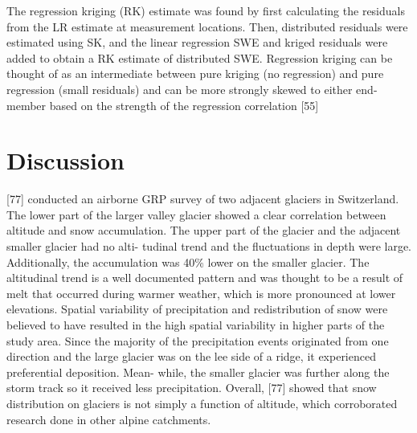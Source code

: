 \documentclass[twoside,twocolumn]{article}
\begin{document}
The regression kriging (RK) estimate was found by first calculating the residuals from the LR estimate at measurement locations. Then, distributed residuals were estimated using SK, and the linear regression SWE and kriged residuals were added to obtain a RK estimate of distributed SWE. Regression kriging can be thought of as an intermediate between pure kriging (no regression) and pure regression (small residuals) and can be more strongly skewed to either end-member based on the strength of the regression correlation [55]







\pagebreak
\pagebreak
\section{Discussion}
[77] conducted an airborne GRP survey of two adjacent glaciers in Switzerland. The
lower part of the larger valley glacier showed a clear correlation between altitude and snow
accumulation. The upper part of the glacier and the adjacent smaller glacier had no alti-
tudinal trend and the fluctuations in depth were large. Additionally, the accumulation was
40\% lower on the smaller glacier. The altitudinal trend is a well documented pattern and
was thought to be a result of melt that occurred during warmer weather, which is more
pronounced at lower elevations. Spatial variability of precipitation and redistribution of
snow were believed to have resulted in the high spatial variability in higher parts of the
study area. Since the majority of the precipitation events originated from one direction and
the large glacier was on the lee side of a ridge, it experienced preferential deposition. Mean-
while, the smaller glacier was further along the storm track so it received less precipitation.
Overall, [77] showed that snow distribution on glaciers is not simply a function of altitude,
which corroborated research done in other alpine catchments.
\end{document}
